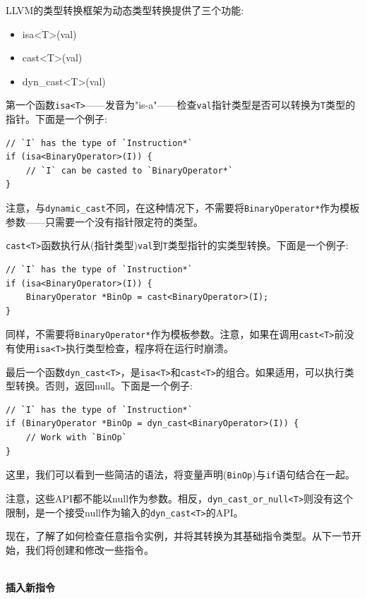 LLVM的类型转换框架为动态类型转换提供了三个功能:

\begin{itemize}
\ttfamily
\item isa<T>(val)
\item cast<T>(val)
\item dyn\_cast<T>(val)
\end{itemize}

第一个函数\texttt{isa<T>}——发音为"is-a"——检查\texttt{val}指针类型是否可以转换为\texttt{T}类型的指针。下面是一个例子:

\begin{lstlisting}[style=styleCXX]
// `I` has the type of `Instruction*`
if (isa<BinaryOperator>(I)) {
	// `I` can be casted to `BinaryOperator*`
}
\end{lstlisting}

注意，与\texttt{dynamic\_cast}不同，在这种情况下，不需要将\texttt{BinaryOperator*}作为模板参数——只需要一个没有指针限定符的类型。

\texttt{cast<T>}函数执行从(指针类型)\texttt{val}到\texttt{T}类型指针的实类型转换。下面是一个例子:

\begin{lstlisting}[style=styleCXX]
// `I` has the type of `Instruction*`
if (isa<BinaryOperator>(I)) {
	BinaryOperator *BinOp = cast<BinaryOperator>(I);
}
\end{lstlisting}

同样，不需要将\texttt{BinaryOperator*}作为模板参数。注意，如果在调用\texttt{cast<T>}前没有使用\texttt{isa<T>}执行类型检查，程序将在运行时崩溃。

最后一个函数\texttt{dyn\_cast<T>}，是\texttt{isa<T>}和\texttt{cast<T>}的组合。如果适用，可以执行类型转换。否则，返回null。下面是一个例子:

\begin{lstlisting}[style=styleCXX]
// `I` has the type of `Instruction*`
if (BinaryOperator *BinOp = dyn_cast<BinaryOperator>(I)) {
	// Work with `BinOp`
}
\end{lstlisting}

这里，我们可以看到一些简洁的语法，将变量声明(\texttt{BinOp})与\texttt{if}语句结合在一起。

注意，这些API都不能以null作为参数。相反，\texttt{dyn\_cast\_or\_null<T>}则没有这个限制，是一个接受null作为输入的\texttt{dyn\_cast<T>}的API。

现在，了解了如何检查任意指令实例，并将其转换为其基础指令类型。从下一节开始，我们将创建和修改一些指令。

\hspace*{\fill} \\ %
\noindent
\textbf{插入新指令}


